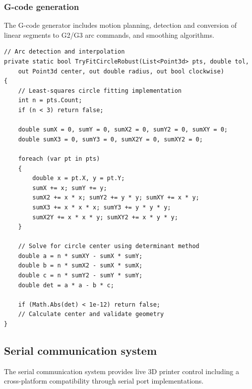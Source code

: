 \subsubsection{G-code generation}

The G-code generator includes motion planning, detection and conversion of linear segments to G2/G3 arc commands, and smoothing algorithms.

\begin{verbatim}
// Arc detection and interpolation
private static bool TryFitCircleRobust(List<Point3d> pts, double tol,
    out Point3d center, out double radius, out bool clockwise)
{
    // Least-squares circle fitting implementation
    int n = pts.Count;
    if (n < 3) return false;
    
    double sumX = 0, sumY = 0, sumX2 = 0, sumY2 = 0, sumXY = 0;
    double sumX3 = 0, sumY3 = 0, sumX2Y = 0, sumXY2 = 0;
    
    foreach (var pt in pts)
    {
        double x = pt.X, y = pt.Y;
        sumX += x; sumY += y;
        sumX2 += x * x; sumY2 += y * y; sumXY += x * y;
        sumX3 += x * x * x; sumY3 += y * y * y;
        sumX2Y += x * x * y; sumXY2 += x * y * y;
    }
    
    // Solve for circle center using determinant method
    double a = n * sumXY - sumX * sumY;
    double b = n * sumX2 - sumX * sumX;
    double c = n * sumY2 - sumY * sumY;
    double det = a * a - b * c;
    
    if (Math.Abs(det) < 1e-12) return false;
    // Calculate center and validate geometry
}
\end{verbatim}

\subsection{Serial communication system}

The serial communication system provides live 3D printer control including a cross-platform compatibility through serial port implementations.

